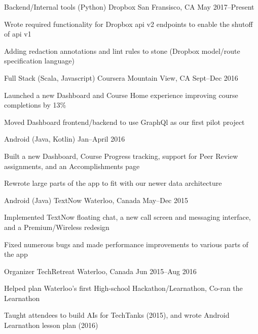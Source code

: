 \begin{cventries}
  \vspace{-1mm}
  \cventry
    {Backend/Internal tools (Python)}
    {Dropbox}
    {San Fransisco, CA}
    {May 2017--Present}
    {
      \begin{cvitems}
        \item {Wrote required functionality for Dropbox api v2 endpoints to enable the shutoff of api v1}
        \item {Adding redaction annotations and lint rules to stone (Dropbox model/route specification language)}
      \end{cvitems} 
    }
  \cventry
    {Full Stack (Scala, Javascript)}
    {Coursera}
    {Mountain View, CA}
    {Sept--Dec 2016}
    {
      \begin{cvitemsnobottom}
        \item {Launched a new Dashboard and Course Home experience improving course completions by 13\%}
        \item {Moved Dashboard frontend/backend to use GraphQl as our first pilot project}
      \end{cvitemsnobottom}
    }
  \cventryaltnoheader
    {Android (Java, Kotlin)}
    {Jan--April 2016}
    {
      \begin{cvitems}
        \item {Built a new Dashboard, Course Progress tracking, support for Peer Review assignments, and an Accomplishments page}
        \item {Rewrote large parts of the app to fit with our newer data architecture}
      \end{cvitems}
    }
  \cventry
    {Android (Java)}
    {TextNow}
    {Waterloo, Canada}
    {May--Dec 2015}
    {
      \begin{cvitems}
        \item {Implemented TextNow floating chat, a new call screen and messaging interface, and a Premium/Wireless redesign}
        \item {Fixed numerous bugs and made performance improvements to various parts of the app}
      \end{cvitems}
    }
  \cventry
    {Organizer}
    {TechRetreat}
    {Waterloo, Canada}
    {Jun 2015--Aug 2016}
    {
      \begin{cvitems}
        \item {Helped plan Waterloo’s first High-school Hackathon/Learnathon, Co-ran the Learnathon}
        \item {Taught attendees to build AIs for TechTanks (2015), and wrote Android Learnathon lesson plan (2016)}
      \end{cvitems} 
    }
    \vspace{-1mm}
\end{cventries}
